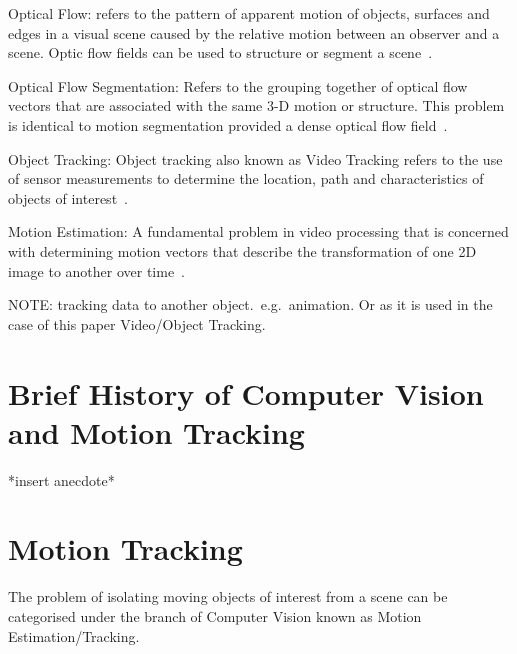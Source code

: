 Optical Flow: refers to the pattern of apparent motion of objects, surfaces and
edges in a visual scene caused by the relative motion between an observer and a
scene. Optic flow fields can be used to structure or segment a scene~\cite{Forsyth2012}.

Optical Flow Segmentation: Refers to the grouping together of optical flow
vectors that are associated with the same 3-D motion or structure. This problem
is identical to motion segmentation provided a dense optical flow field~\cite{Tekalp2014}.

Object Tracking: Object tracking also known as Video Tracking refers to the use
of sensor measurements to determine the location, path and characteristics of
objects of interest~\cite{Challa2011}.
 
Motion Estimation: A fundamental problem in video processing that is concerned
with determining motion vectors that describe the transformation of one 2D
image to another over time~\cite{Tekalp2014}.

NOTE:\@
tracking data to another object.\ e.g.\ animation. Or as it is used in the
case of this paper Video/Object Tracking.

\section{Brief History of Computer Vision and Motion Tracking}
*insert anecdote*

\section{Motion Tracking}
The problem of isolating moving objects of interest from a scene can
be categorised under the branch of Computer Vision known as Motion
Estimation/Tracking.

